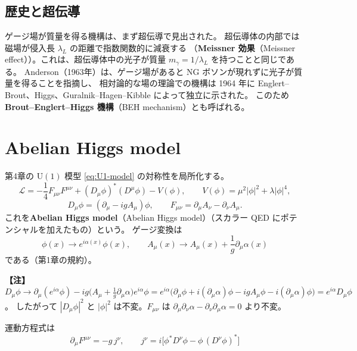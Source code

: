 \documentclass[uplatex,dvipdfmx,a4paper,11pt,openany]{jsbook}
\newcommand{\term}[2]{\textbf{#1}（#2）}
\newenvironment{note}{\vspace{1ex}\par\footnotesize\noindent\textbf{【注】}}{\par\vspace{1ex}}
\numberwithin{equation}{chapter}
\theoremstyle{definition}
\theoremstyle{plain}
\theoremstyle{remark}
\newcommand{\Lag}{\mathcal{L}}
\newcommand{\U}{\mathrm{U}}
\begin{document}
\subsection{歴史と超伝導}
ゲージ場が質量を得る機構は、まず超伝導で見出された。
超伝導体の内部では磁場が侵入長 $\lambda_L$ の距離で指数関数的に減衰する
（\term{Meissner 効果}{Meissner effect}）。これは、超伝導体中の光子が質量 $m_\gamma=1/\lambda_L$ を持つことと同じである。
Anderson（1963年）は、ゲージ場があると NG ボソンが現れずに光子が質量を得ることを指摘し、
相対論的な場の理論での機構は 1964 年に Englert--Brout、Higgs、Guralnik--Hagen--Kibble によって独立に示された。
このため\term{Brout--Englert--Higgs 機構}{BEH mechanism}とも呼ばれる。
\section{Abelian Higgs model}
\label{sec:abelian-higgs}
第4章の $\U(1)$ 模型 \eqref{eq:U1-model} の対称性を局所化する。
\begin{equation}
\Lag=-\frac14F_{\mu\nu}F^{\mu\nu}+(D_\mu\phi)^*(D^\mu\phi)-V(\phi),
\qquad
V(\phi)=\mu^2|\phi|^2+\lambda|\phi|^4,
\label{eq:abelian-higgs}
\end{equation}
\begin{equation}
D_\mu\phi=(\partial_\mu-igA_\mu)\phi,\qquad F_{\mu\nu}=\partial_\mu A_\nu-\partial_\nu A_\mu .
\end{equation}
これを\term{Abelian Higgs model}{Abelian Higgs model}（スカラー QED にポテンシャルを加えたもの）という。
ゲージ変換は
\begin{equation}
\phi(x)\to e^{i\alpha(x)}\phi(x),\qquad A_\mu(x)\to A_\mu(x)+\frac1g\partial_\mu\alpha(x)
\label{eq:U1-gauge-transf}
\end{equation}
である（第1章の規約）。
\begin{note}
$D_\mu\phi\to\partial_\mu(e^{i\alpha}\phi)-ig\bigl(A_\mu+\tfrac1g\partial_\mu\alpha\bigr)e^{i\alpha}\phi
=e^{i\alpha}\bigl(\partial_\mu\phi+i(\partial_\mu\alpha)\phi-igA_\mu\phi-i(\partial_\mu\alpha)\phi\bigr)=e^{i\alpha}D_\mu\phi$。
したがって $|D_\mu\phi|^2$ と $|\phi|^2$ は不変。$F_{\mu\nu}$ は $\partial_\mu\partial_\nu\alpha-\partial_\nu\partial_\mu\alpha=0$ より不変。
\end{note}
運動方程式は
\begin{equation}
\partial_\mu F^{\mu\nu}=-g\,j^\nu,\qquad
j^\nu=i\bigl[\phi^*D^\nu\phi-\phi\,(D^\nu\phi)^*\bigr]
\label{eq:abelian-higgs-eom}
\end{equation}
\end{document}
